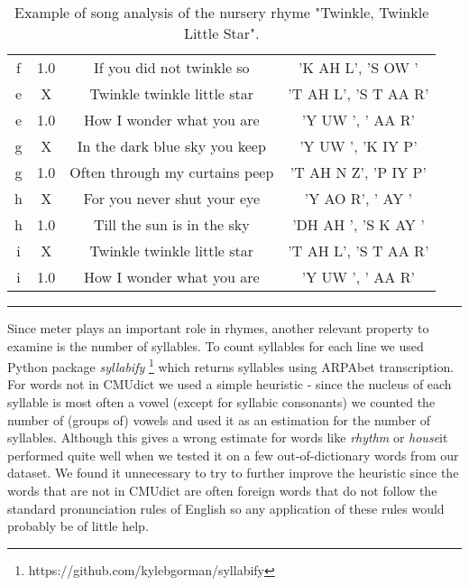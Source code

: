 \begin{table}[h!]
\begin{tabular}{c|c|c|c}
	f  & 1.0  & If you did not twinkle so & 'K AH L', 'S OW ' \\
	e  & X    & Twinkle twinkle little star &  'T AH L', 'S T AA R' \\
	e  & 1.0  & How I wonder what you are &  'Y UW ', ' AA R' \\[0.5ex]
	\hline
	g  & X    & In the dark blue sky you keep & 'Y UW ', 'K IY P' \\
	g  & 1.0  & Often through my curtains peep &  'T AH N Z', 'P IY P' \\
	h  & X    & For you never shut your eye &  'Y AO R', ' AY ' \\
	h  & 1.0  & Till the sun is in the sky & 'DH AH ', 'S K AY ' \\
	i  & X    & Twinkle twinkle little star & 'T AH L', 'S T AA R' \\
	i  & 1.0  & How I wonder what you are &  'Y UW ', ' AA R' \\
	\end{tabular}
	\caption{Example of song analysis of the nursery rhyme "Twinkle, Twinkle Little Star".}
	\label{twinkle_analysis_table}
\end{table}


	
\noindent\rule{14cm}{0.4pt}

Since meter plays an important role in rhymes, another relevant property to examine is the number of syllables. To count syllables for each line we used Python package \textit{syllabify} \footnote{https://github.com/kylebgorman/syllabify} which returns syllables using ARPAbet transcription. For words not in CMUdict we used a simple heuristic - since the nucleus of each syllable is most often a vowel (except for syllabic consonants) we counted the number of (groups of) vowels and used it as an estimation for the number of syllables. Although this gives a wrong estimate for words like \textit{rhythm} or \textit{house}it performed quite well when we tested it on a few out-of-dictionary words from our dataset. We found it unnecessary to try to further improve the heuristic since the words that are not in CMUdict are often foreign words that do not follow the standard pronunciation rules of English so any application of these rules would probably be of little help.


